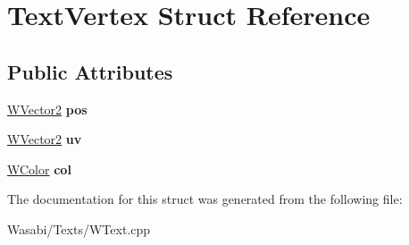 \hypertarget{struct_text_vertex}{}\section{Text\+Vertex Struct Reference}
\label{struct_text_vertex}
\subsection*{Public Attributes}
\begin{DoxyCompactItemize}
\item 
\hyperlink{class_w_vector2}{W\+Vector2} {\bfseries pos}\hypertarget{struct_text_vertex_a38d1a81ac3af4575e07f94871e71b920}{}\label{struct_text_vertex_a38d1a81ac3af4575e07f94871e71b920}

\item 
\hyperlink{class_w_vector2}{W\+Vector2} {\bfseries uv}\hypertarget{struct_text_vertex_a501aec3b3873ebd1259af7075abc7b25}{}\label{struct_text_vertex_a501aec3b3873ebd1259af7075abc7b25}

\item 
\hyperlink{class_w_color}{W\+Color} {\bfseries col}\hypertarget{struct_text_vertex_a974333416415408a938fb478b5c44e40}{}\label{struct_text_vertex_a974333416415408a938fb478b5c44e40}

\end{DoxyCompactItemize}


The documentation for this struct was generated from the following file\+:\begin{DoxyCompactItemize}
\item 
Wasabi/\+Texts/W\+Text.\+cpp\end{DoxyCompactItemize}
